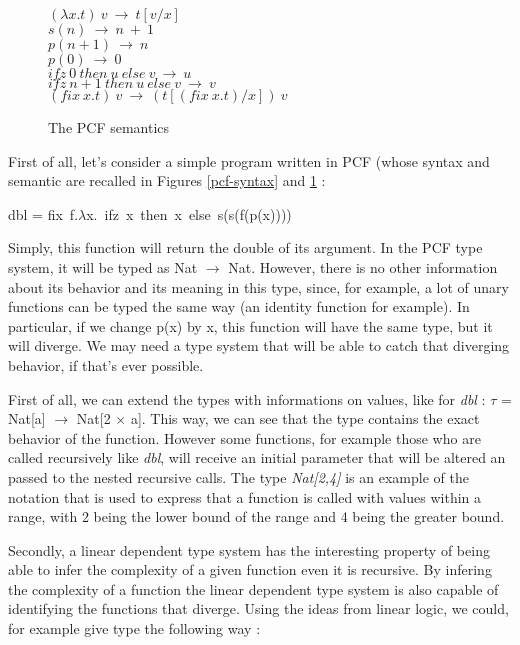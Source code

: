 \documentclass[a4paper,12pt]{article}
\begin{document}
\begin{figure}
  \begin{center}
    $(\lambda x.t)~v~\rightarrow~ t[v/x]$ \\
    $s(n)~\rightarrow~ n~+~1$ \\
    $p(n+1)~\rightarrow~ n$ \\
    $p(0)~\rightarrow~ 0$ \\
    $ifz~0~then~u~else~v~\rightarrow~u$ \\
    $ifz~n+1~then~u~else~v~\rightarrow~v$ \\
    $(fix~x.t)~v~\rightarrow~(t[(fix~x.t)/x])~v$
  \end{center}
  \caption{The PCF semantics}
  \label{pcf-sem}
\end{figure}

First of all, let's consider a simple program written in PCF (whose syntax and
semantic are recalled in Figures \ref{pcf-syntax} and \ref{pcf-sem} :

\begin{center} 
  dbl = fix~f.$\lambda $x.~ifz~x~then~x~else~s(s(f(p(x)))) 
\end{center}

Simply, this function will return the double of its argument. In the PCF type
system, it will be typed as Nat $\rightarrow$ Nat. However, there is no other
information about its behavior and its meaning in this type, since, for example,
a lot of unary functions can be typed the same way (an identity function for
example). In particular, if we change p(x) by x, this function will have the
same type, but it will diverge. We may need a type system that will be able to
catch that diverging behavior, if that's ever possible.

First of all, we can extend the types with informations on values,
like for \emph{dbl} : $\tau$ = Nat[a] $\rightarrow$ Nat[2 $\times$
a]. This way, we can see that the type contains the exact behavior of
the function. However some functions, for example those who are called
recursively like \emph{dbl}, will receive an initial parameter that
will be altered an passed to the nested recursive calls. The type
\emph{Nat[2,4]} is an example of the notation that is used to
express that a function is called with values within a range, with 2
being the lower bound of the range and 4 being the greater
bound.

\medskip

Secondly, a linear dependent type system has the interesting property of
being able to infer the complexity of a given function even it is
recursive. By infering the complexity of a function the linear
dependent type system is also capable of identifying the functions that
diverge. Using the ideas from linear logic, we could, for
example give type the following way :
\end{document}
